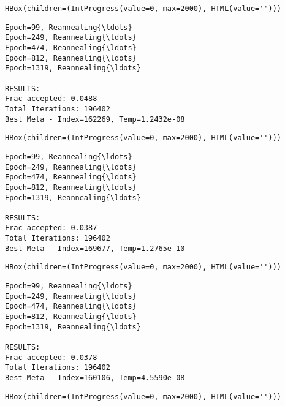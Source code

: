\documentclass[11pt]{article}
\begin{document}
    
    \begin{verbatim}
HBox(children=(IntProgress(value=0, max=2000), HTML(value='')))
    \end{verbatim}

    
    \begin{Verbatim}[commandchars=\\\{\}]
Epoch=99, Reannealing{\ldots}
Epoch=249, Reannealing{\ldots}
Epoch=474, Reannealing{\ldots}
Epoch=812, Reannealing{\ldots}
Epoch=1319, Reannealing{\ldots}

RESULTS:
Frac accepted: 0.0488
Total Iterations: 196402
Best Meta - Index=162269, Temp=1.2432e-08

    \end{Verbatim}

    
    \begin{verbatim}
HBox(children=(IntProgress(value=0, max=2000), HTML(value='')))
    \end{verbatim}

    
    \begin{Verbatim}[commandchars=\\\{\}]
Epoch=99, Reannealing{\ldots}
Epoch=249, Reannealing{\ldots}
Epoch=474, Reannealing{\ldots}
Epoch=812, Reannealing{\ldots}
Epoch=1319, Reannealing{\ldots}

RESULTS:
Frac accepted: 0.0387
Total Iterations: 196402
Best Meta - Index=169677, Temp=1.2765e-10

    \end{Verbatim}

    
    \begin{verbatim}
HBox(children=(IntProgress(value=0, max=2000), HTML(value='')))
    \end{verbatim}

    
    \begin{Verbatim}[commandchars=\\\{\}]
Epoch=99, Reannealing{\ldots}
Epoch=249, Reannealing{\ldots}
Epoch=474, Reannealing{\ldots}
Epoch=812, Reannealing{\ldots}
Epoch=1319, Reannealing{\ldots}

RESULTS:
Frac accepted: 0.0378
Total Iterations: 196402
Best Meta - Index=160106, Temp=4.5590e-08

    \end{Verbatim}

    
    \begin{verbatim}
HBox(children=(IntProgress(value=0, max=2000), HTML(value='')))
    \end{verbatim}
\end{document}
